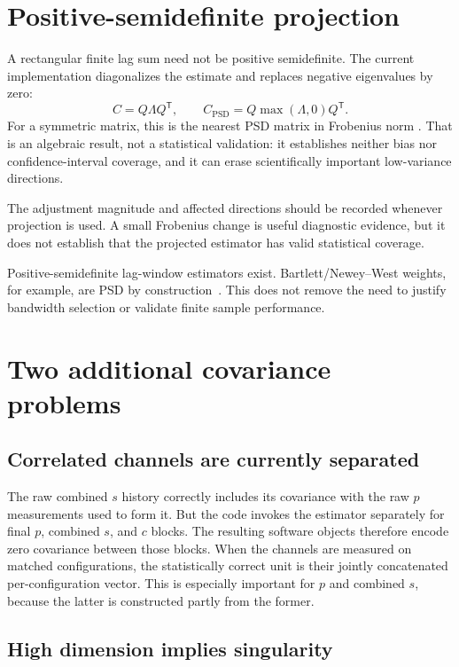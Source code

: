 \documentclass[11pt]{article}
\begin{document}
\section{Positive-semidefinite projection}

A rectangular finite lag sum need not be positive semidefinite. The current
implementation diagonalizes the estimate and replaces negative eigenvalues
by zero:
\[
  C=Q\Lambda Q^{\mathsf T},
  \qquad
  C_{\mathrm{PSD}}=Q\max(\Lambda,0)Q^{\mathsf T}.
\]
For a symmetric matrix, this is the nearest PSD matrix in Frobenius norm
\cite{Higham1988}. That is an algebraic result, not a statistical validation:
it establishes neither bias nor confidence-interval coverage, and it can
erase scientifically important low-variance directions.

The adjustment magnitude and affected directions should be recorded whenever
projection is used. A small Frobenius change is useful diagnostic evidence,
but it does not establish that the projected estimator has valid statistical
coverage.

Positive-semidefinite lag-window estimators exist. Bartlett/Newey--West
weights, for example, are PSD by construction~\cite{NeweyWest1987}. This
does not remove the need to justify bandwidth selection or validate finite
sample performance.

\section{Two additional covariance problems}

\subsection{Correlated channels are currently separated}

The raw combined \(s\) history correctly includes its covariance with the
raw \(p\) measurements used to form it. But the code invokes the estimator
separately for final \(p\), combined \(s\), and \(c\) blocks. The resulting
software objects therefore encode zero covariance between those blocks.
When the channels are measured on matched configurations, the statistically
correct unit is their jointly concatenated per-configuration vector. This
is especially important for \(p\) and combined \(s\), because the latter is
constructed partly from the former.

\subsection{High dimension implies singularity}
\end{document}
